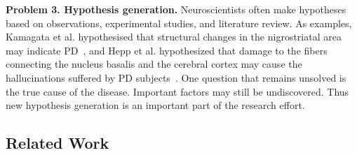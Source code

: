 \vspace{1pt}
\noindent\textbf{Problem 3. Hypothesis generation.}
Neuroscientists often make hypotheses based on observations, experimental studies, and literature review. As examples, Kamagata et al. hypothesised that 
structural 
changes in the nigrostriatal area 
may indicate PD~\cite{kamagata2016neurite}, and Hepp et al. hypothesized that damage to the fibers
connecting the nucleus basalis
and the cerebral cortex may cause the hallucinations suffered by PD subjects~\cite{hepp2017damaged}. One 
question that remains unsolved is the true cause of the disease.  
Important factors may still be 
undiscovered.
Thus new hypothesis generation is an important part of the
research effort. 


\subsection{Related Work}


